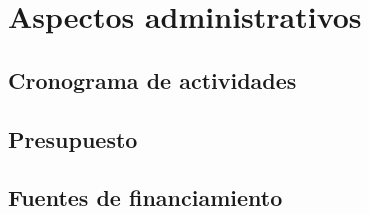 \chapter{Aspectos administrativos}
\thispagestyle{empty}

\section{Cronograma de actividades}
\section{Presupuesto}
\section{Fuentes de financiamiento}

